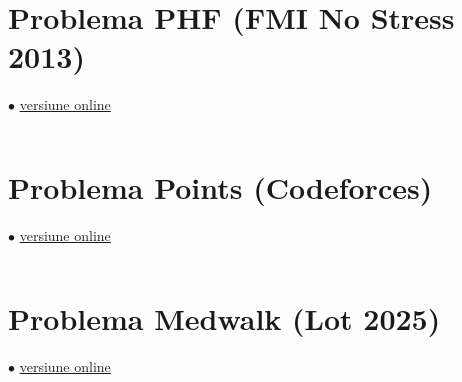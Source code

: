 \documentclass[../main.tex]{subfiles}
\begin{document}
\inputminted{cpp}{../src/segment-trees/copying-data.cpp}

\section{Problema PHF (FMI No Stress 2013)}
\label{code:phf}
$\bullet$
\href{https://kilonova.ro/submissions/799391}{versiune online}

\inputminted{cpp}{../src/segment-trees/phf.cpp}

\section{Problema Points (Codeforces)}
\label{code:points}
$\bullet$
\href{https://codeforces.com/contest/19/submission/281139891}{versiune online}

\inputminted{cpp}{../src/segment-trees/points.cpp}

\section{Problema Medwalk (Lot  2025)}
\label{code:medwalk}
$\bullet$
\href{https://kilonova.ro/submissions/770116}{versiune online}

\inputminted{cpp}{../src/segment-trees/medwalk.cpp}
\end{document}
